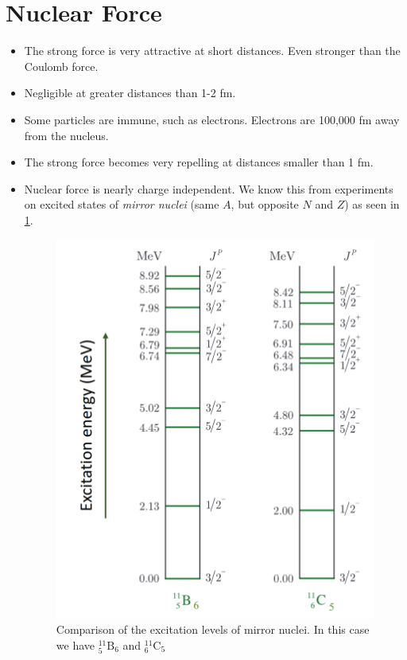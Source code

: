 \documentclass{article}
\begin{document}
\section{Nuclear Force}
\begin{itemize}
    \item The strong force is very attractive at short distances. Even stronger than the Coulomb force. 
    \item Negligible at greater distances than 1-2 fm. 
    \item Some particles are immune, such as electrons. Electrons are 100,000 fm away from the nucleus.  
    \item The strong force becomes very repelling at distances smaller than 1 fm. 
    \item Nuclear force is nearly charge independent. We know this from experiments on excited states of \textit{mirror nuclei} (same $A$, but opposite $N$ and $Z$) as seen in \cref{fig: mirror_nuclei_excitation_levels_comparison}.
    \begin{figure}[h!]
    \centering
    \includegraphics[width = .5\textwidth]{mirror_nuclei_excitation_levels_comparison.png}
    \caption{Comparison of the excitation levels of mirror nuclei. In this case we have $\displaystyle _{5}^{11}\text{B}_{6}$ and $\displaystyle _{6}^{11}\text{C}_{5}$}
    \label{fig: mirror_nuclei_excitation_levels_comparison}
    \end{figure} 
    
\end{itemize}
\end{document}
